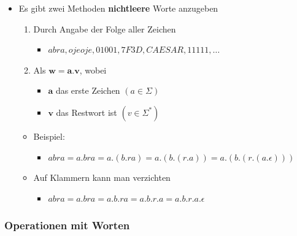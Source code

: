 \documentclass{scrartcl}
\begin{document}
\begin{itemize}
	\item Es gibt zwei Methoden \textbf{nichtleere} Worte anzugeben
	\begin{enumerate}
		\item Durch Angabe der Folge aller Zeichen
		\begin{itemize}
			\item $abra,ojeoje,01001,7F3D,CAESAR,11111,\ldots$
		\end{itemize}
		\item Als $\mathbf{w = a.v}$, wobei
		\begin{itemize}
			\item $\mathbf{a}$ das erste Zeichen $(a \in \Sigma)$
			\item $\mathbf{v}$ das Restwort ist $(v \in \Sigma^*)$
		\end{itemize}
	\end{enumerate}
	\begin{itemize}
		\item Beispiel:
		\begin{itemize}
			\item $abra = a.bra = a.(b.ra) = a.(b.(r.a)) = a.(b.(r.(a.\epsilon)))$
		\end{itemize}
		\item Auf Klammern kann man verzichten
		\begin{itemize}
			\item $abra = a.bra = a.b.ra = a.b.r.a = a.b.r.a.\epsilon$
		\end{itemize}
	\end{itemize}
\end{itemize}

\subsubsection{Operationen mit Worten}
\end{document}
